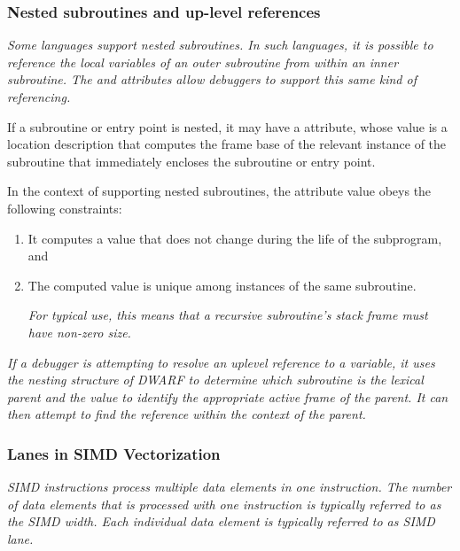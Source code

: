\bbeb
\subsubsection{Nested subroutines and up-level references}
\label{nestedsubroutinesanduplevelreferences}
\textit{Some languages support nested subroutines. In such languages,
it is possible to reference the local variables of an
outer subroutine from within an inner subroutine. The
\DWATstaticlink{} and \DWATframebase{} attributes allow
debuggers to support this same kind of referencing.}

If\hypertarget{chap:DWATstaticlinklocationofuplevelframe}{}
a subroutine or entry point is nested, it may have a
\DWATstaticlinkDEFN{} attribute, whose value is a location
description that computes the frame base of the relevant
instance of the subroutine that immediately encloses the
subroutine or entry point.

In the context of supporting nested subroutines, the
\DWATframebase{} attribute value obeys the following constraints:

\begin{enumerate}[1. ]
\item
It computes a value that does not change during the
life of the subprogram, and

\item The computed value is unique among instances of
the same subroutine.

\textit{For typical \DWATframebase{} use, this
means that a recursive subroutine\textquoteright s stack frame must have
non-zero size.}

\end{enumerate}

\textit{If a debugger is attempting to resolve an up\dash level reference
to a variable, it uses the nesting structure of DWARF to
determine which subroutine is the lexical parent and the
\DWATstaticlink{} value to identify the appropriate active
frame of the parent. It can then attempt to find the reference
within the context of the parent.}

\bbeb\subsubsection{Lanes in SIMD Vectorization}
\label{chap:lanesinsimdvectorization}
\bb
\textit{SIMD instructions process multiple data elements in
one instruction. The number of data elements that is processed
with one instruction is typically referred to as the SIMD width.
Each individual data element is typically referred to as SIMD lane.}

